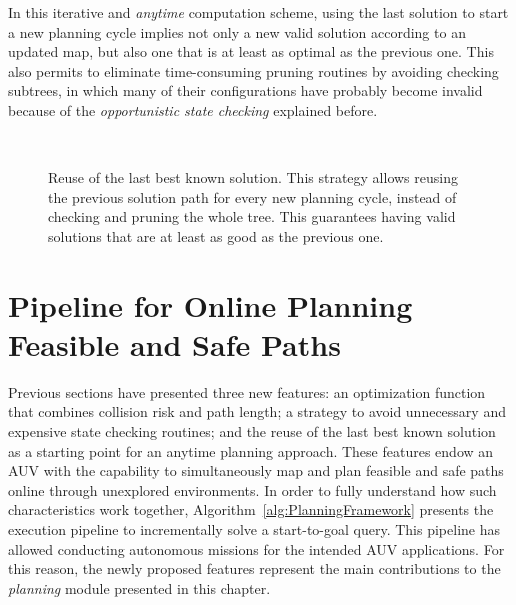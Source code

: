 In this iterative and \textit{anytime} computation scheme, using the last
solution to start a new planning cycle implies not only a new valid solution
according to an updated map, but also one that is at least as optimal as the
previous one. This also permits to eliminate time-consuming pruning routines by
avoiding checking subtrees, in which many of their configurations have probably
become invalid because of the \textit{opportunistic state checking} explained
before.

\begin{figure}[htbp]
\myfloatalign
     \quad
     \\
     \quad
\caption[Reuse of the last best known solution.]
{Reuse of the last best known solution. This strategy allows reusing the
previous solution path for every new planning cycle, instead of checking and
pruning the whole tree. This guarantees having valid solutions that are at
least as good as the previous one.}
\label{fig:ReuseLastBestKnownSolutionState}
\end{figure}

\section{Pipeline for Online Planning Feasible and Safe Paths}
\label{sec:PipelineOnlPlanFeasSafePaths}

Previous sections have presented three new features: an optimization function
that combines collision risk and path length; a strategy to avoid unnecessary
and expensive state checking routines; and the reuse of the last best known
solution as a starting point for an anytime planning approach. These features
endow an \ac{AUV} with the capability to simultaneously map and plan feasible
and safe paths online through unexplored environments. In order to fully
understand how such characteristics work together,
Algorithm~\ref{alg:PlanningFramework} presents the execution pipeline to
incrementally solve a start-to-goal query. This pipeline has allowed conducting
autonomous missions for the intended \ac{AUV} applications. For this reason, the
newly proposed features represent the main contributions to the
\textit{planning} module presented in this chapter.

